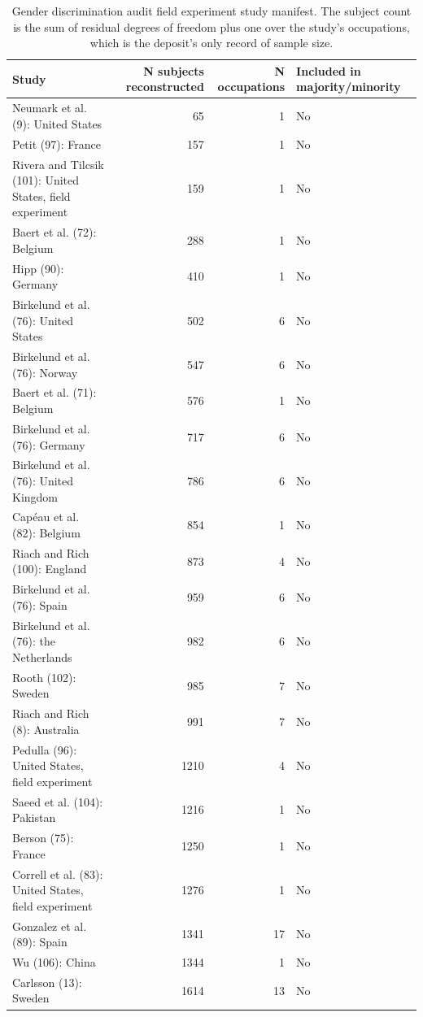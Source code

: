 \begin{table}

\caption{Gender discrimination audit field experiment study manifest. The subject count is the sum of residual degrees of freedom plus one over the study's occupations, which is the deposit's only record of sample size.}
\centering
\begin{tabular}[t]{lrrl}
\toprule
Study & N subjects reconstructed & N occupations & Included in majority/minority\\
\midrule
Neumark et al. (9): United States & 65 & 1 & No\\
Petit (97): France & 157 & 1 & No\\
Rivera and Tilcsik (101): United States, field experiment & 159 & 1 & No\\
Baert et al. (72): Belgium & 288 & 1 & No\\
Hipp (90): Germany & 410 & 1 & No\\
\addlinespace
Birkelund et al. (76): United States & 502 & 6 & No\\
Birkelund et al. (76): Norway & 547 & 6 & No\\
Baert et al. (71): Belgium & 576 & 1 & No\\
Birkelund et al. (76): Germany & 717 & 6 & No\\
Birkelund et al. (76): United Kingdom & 786 & 6 & No\\
\addlinespace
Capéau et al. (82): Belgium & 854 & 1 & No\\
Riach and Rich (100): England & 873 & 4 & No\\
Birkelund et al. (76): Spain & 959 & 6 & No\\
Birkelund et al. (76): the Netherlands & 982 & 6 & No\\
Rooth (102): Sweden & 985 & 7 & No\\
\addlinespace
Riach and Rich (8): Australia & 991 & 7 & No\\
Pedulla (96): United States, field experiment & 1210 & 4 & No\\
Saeed et al. (104): Pakistan & 1216 & 1 & No\\
Berson (75): France & 1250 & 1 & No\\
Correll et al. (83): United States, field experiment & 1276 & 1 & No\\
\addlinespace
Gonzalez et al. (89): Spain & 1341 & 17 & No\\
Wu (106): China & 1344 & 1 & No\\
Carlsson (13): Sweden & 1614 & 13 & No\\

\end{tabular}
\end{table}
